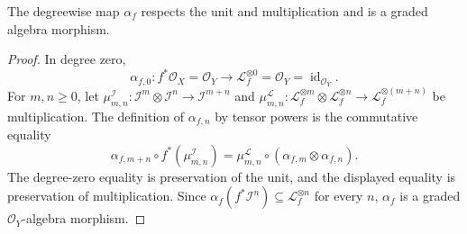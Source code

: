 \begin{lemma}
  \label{lemma:nagata-blowup-universal-graded-map}

  The degreewise map $\alpha_f$ respects the unit and multiplication and is a
  graded algebra morphism.
\end{lemma}

\begin{proof}
  In degree zero,
  \[
    \alpha_{f,0}\colon f^*\mathcal O_X=\mathcal O_Y
      \longrightarrow\mathcal L_f^{\otimes0}=\mathcal O_Y
      =\operatorname{id}_{\mathcal O_Y}.
  \]
  For $m,n\ge0$, let
  $\mu^{\mathcal I}_{m,n}\colon\mathcal I^m\otimes\mathcal I^n
  \to\mathcal I^{m+n}$ and
  $\mu^{\mathcal L}_{m,n}\colon\mathcal L_f^{\otimes m}\otimes
  \mathcal L_f^{\otimes n}\to\mathcal L_f^{\otimes(m+n)}$ be multiplication.
  The definition of $\alpha_{f,n}$ by tensor powers is the commutative
  equality
  \[
    \alpha_{f,m+n}\circ f^*(\mu^{\mathcal I}_{m,n})
      =\mu^{\mathcal L}_{m,n}\circ
        (\alpha_{f,m}\otimes\alpha_{f,n}).
  \]
  The degree-zero equality is preservation of the unit, and the displayed
  equality is preservation of multiplication.  Since
  $\alpha_f(f^*\mathcal I^n)\subseteq\mathcal L_f^{\otimes n}$ for every
  $n$, $\alpha_f$ is a graded $\mathcal O_Y$-algebra morphism.
\end{proof}

